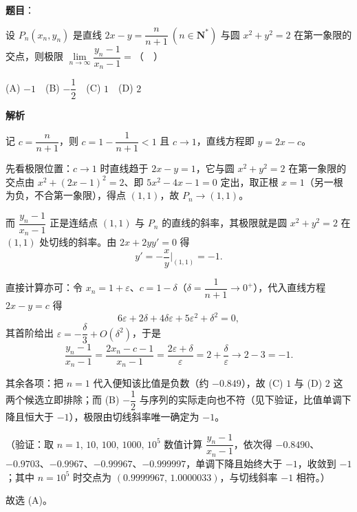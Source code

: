 \begin{answer}

\textbf{题目}：

设 \(P_{n}(x_{n},y_{n})\) 是直线 \(2x-y=\dfrac{n}{n+1}\ (n\in\mathbf{N}^{*})\) 与圆 \(x^{2}+y^{2}=2\) 在第一象限的交点，则极限 \(\lim\limits_{n\to\infty}\dfrac{y_{n}-1}{x_{n}-1}=\)（　）

(A) \(-1\)　(B) \(-\dfrac{1}{2}\)　(C) \(1\)　(D) \(2\)

\textbf{解析}

记 \(c=\dfrac{n}{n+1}\)，则 \(c=1-\dfrac{1}{n+1}<1\) 且 \(c\to1\)，直线方程即 \(y=2x-c\)。

先看极限位置：\(c\to1\) 时直线趋于 \(2x-y=1\)，它与圆 \(x^{2}+y^{2}=2\) 在第一象限的交点由 \(x^{2}+(2x-1)^{2}=2\)、即 \(5x^{2}-4x-1=0\) 定出，取正根 \(x=1\)（另一根为负，不合第一象限），得点 \((1,1)\)，故 \(P_{n}\to(1,1)\)。

而 \(\dfrac{y_{n}-1}{x_{n}-1}\) 正是连结点 \((1,1)\) 与 \(P_{n}\) 的直线的斜率，其极限就是圆 \(x^{2}+y^{2}=2\) 在 \((1,1)\) 处切线的斜率。由 \(2x+2yy'=0\) 得
\nopagebreak[4]
\[
y'=-\frac{x}{y}\Big|_{(1,1)}=-1.
\]

直接计算亦可：令 \(x_{n}=1+\varepsilon\)、\(c=1-\delta\)（\(\delta=\dfrac{1}{n+1}\to0^{+}\)），代入直线方程 \(2x-y=c\) 得
\nopagebreak[4]
\[
6\varepsilon+2\delta+4\delta\varepsilon+5\varepsilon^{2}+\delta^{2}=0,
\]
其首阶给出 \(\varepsilon=-\dfrac{\delta}{3}+O(\delta^{2})\)，于是
\nopagebreak[4]
\[
\frac{y_{n}-1}{x_{n}-1}=\frac{2x_{n}-c-1}{x_{n}-1}=\frac{2\varepsilon+\delta}{\varepsilon}=2+\frac{\delta}{\varepsilon}\to2-3=-1.
\]

其余各项：把 \(n=1\) 代入便知该比值是负数（约 \(-0.849\)），故 (C) \(1\) 与 (D) \(2\) 这两个候选立即排除；而 (B) \(-\dfrac{1}{2}\) 与序列的实际走向也不符（见下验证，比值单调下降且恒大于 \(-1\)），极限由切线斜率唯一确定为 \(-1\)。

（验证：取 \(n=1,\,10,\,100,\,1000,\,10^{5}\) 数值计算 \(\dfrac{y_{n}-1}{x_{n}-1}\)，依次得 \(-0.8490\)、\(-0.9703\)、\(-0.9967\)、\(-0.99967\)、\(-0.999997\)，单调下降且始终大于 \(-1\)，收敛到 \(-1\)；其中 \(n=10^{5}\) 时交点为 \((0.9999967,\,1.0000033)\)，与切线斜率 \(-1\) 相符。）

故选 (A)。


\end{answer}
